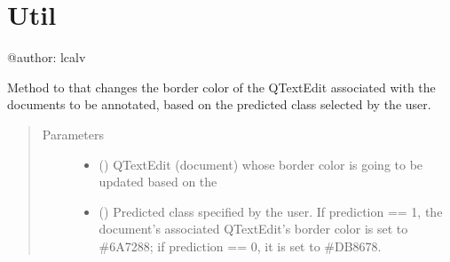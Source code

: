 \documentclass[letterpaper,10pt,english]{sphinxmanual}
\begin{document}
\chapter{Util}
\label{\detokenize{gui_util:util}}\label{\detokenize{gui_util::doc}}\label{\detokenize{gui_util:module-src.graphical_user_interface.util}}
\sphinxAtStartPar
@author: lcalv

\begin{fulllineitems}
\label{\detokenize{gui_util:src.graphical_user_interface.util.change_background_color_text_edit}}
\sphinxAtStartPar
Method to that changes the border color of the QTextEdit associated with the documents to be annotated, based on
the predicted class selected by the user.
\begin{quote}\begin{description}
\item[{Parameters}] \leavevmode\begin{itemize}
\item {} 
\sphinxAtStartPar
{} () \textendash{} QTextEdit (document) whose border color is going to be updated based on the

\item {} 
\sphinxAtStartPar
{} () \textendash{} Predicted class specified by the user. If prediction == 1, the document’s associated QTextEdit’s border
color is set to \#6A7288; if prediction == 0, it is set to \#DB8678.

\end{itemize}

\end{description}\end{quote}

\end{fulllineitems}
\end{document}
